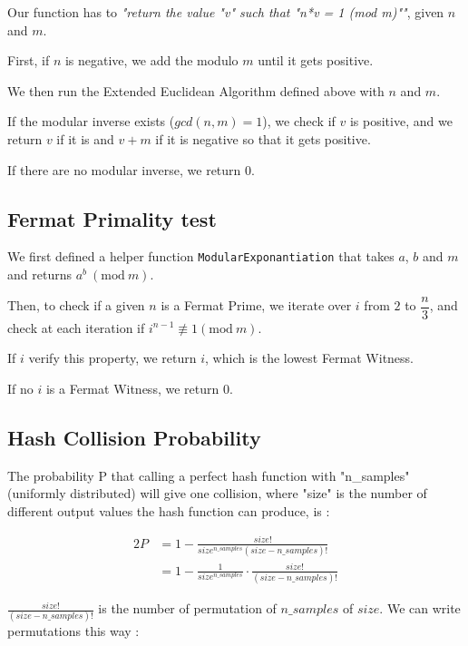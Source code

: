 \documentclass[12pt]{article}
\begin{document}
Our function has to \textit{"return the value "v" such that "n*v = 1 (mod m)""}, given $n$ and $m$.

First, if $n$ is negative, we add the modulo $m$ until it gets positive.

We then run the Extended Euclidean Algorithm defined above with $n$ and $m$.

If the modular inverse exists ($gcd(n, m) = 1$), we check if $v$ is positive, and we return $v$ if it is and $v+m$ if it is negative so that it gets positive.

If there are no modular inverse, we return 0.

\subsection{Fermat Primality test}

We first defined a helper function \verb+ModularExponantiation+ that takes $a$, $b$ and $m$ and returns $a^b\ (\textrm{mod}\ m)$.

Then, to check if a given $n$ is a Fermat Prime, we iterate over $i$ from $2$ to $\dfrac{n}{3}$, and check at each iteration if $i^{n-1} \not\equiv 1 (\textrm{mod}\ m)$.

If $i$ verify this property, we return $i$, which is the lowest Fermat Witness.

If no $i$ is a Fermat Witness, we return $0$.

\subsection{Hash Collision Probability}

The probability P that calling a perfect hash function with "n\_samples" (uniformly distributed) will give one collision, where "size" is the number of different output values the hash function can produce, is :

\vspace{-2em}
\begin{alignat*}{2}
    P & = 1 - {\frac {size!}{size^{n\_samples}(size-n\_samples)!}} \\
    & = 1 - {\frac{1}{size^{n\_samples}}}\cdot{\frac {size!}{(size-n\_samples)!}}
\end{alignat*}
\vspace{-1em}

${\frac {size!}{(size-n\_samples)!}}$ is the number of permutation of $n\_samples$ of $size$. We can write permutations this way :
\end{document}
